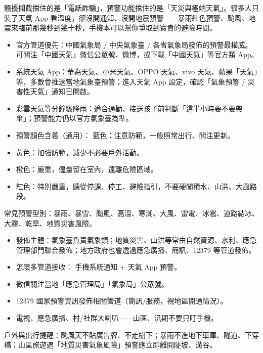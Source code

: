 
騷擾攔截擋住的是「電話詐騙」，預警功能擋住的是「天災與極端天氣」。很多人只裝了天氣 App 看溫度，卻沒開通知、沒開地震預警——暴雨紅色預警、颱風、地震來臨前那幾秒到幾十秒，手機本可以幫你爭取到寶貴的避險時間。


\begin{itemize}
  \item 官方管道優先：中國氣象局 / 中央氣象臺 / 各省氣象局發佈的預警最權威。可關注「中國天氣」微信公眾號、微博，或下載「中國天氣」等官方類 App。
  \item 系統天氣 App：華為天氣、小米天氣、OPPO 天氣、vivo 天氣、蘋果「天氣」等，多數會推送當地氣象臺預警；進入天氣 App 設定，確認「氣象預警 / 災害性天氣」通知已開啟。
  \item 彩雲天氣等分鐘級降雨：適合通勤、接送孩子前判斷「這半小時要不要帶傘」；預警能力仍以官方氣象臺為準。
  \item 預警顏色含義（通用）： 藍色：注意防範，一般照常出行、關注更新。
  \item 黃色：加強防範，減少不必要戶外活動。
  \item 橙色：嚴重，儘量留在室內，遠離危險區域。
  \item 紅色：特別嚴重，聽從停課、停工、避險指引，不要硬闖積水、山洪、大風路段。
\end{itemize}

常見預警型別：暴雨、暴雪、颱風、高溫、寒潮、大風、雷電、冰雹、道路結冰、大霧、乾旱、地質災害風險。


\begin{itemize}
  \item 發佈主體：氣象臺負責氣象類；地質災害、山洪等常由自然資源、水利、應急管理部門聯合發佈；地方政府也會透過應急廣播、簡訊、12379 等管道發佈。
  \item 怎麼多管道接收： 手機系統通知 + 天氣 App 預警。
  \item 微信關注當地「應急管理局」「氣象局」公眾號。
  \item 12379 國家預警資訊發佈相關管道（簡訊/服務，視地區開通情況）。
  \item 電視、應急廣播、村/社群大喇叭——山區、汛期不要只盯手機。
\end{itemize}

戶外與出行提醒：颱風天不貼廣告牌、不走樹下；暴雨不進地下車庫、隧道、下穿橋；山區旅遊遇「地質災害氣象風險」預警應立即離開陡坡、溝谷。

